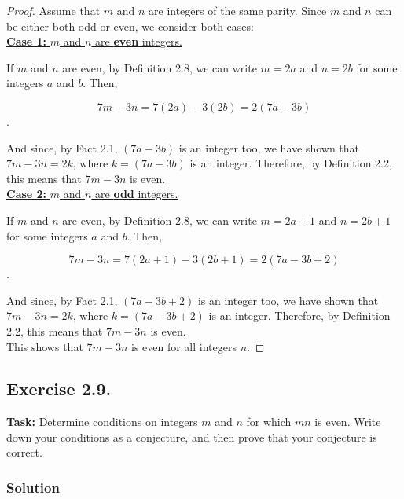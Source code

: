 \documentclass{article}
\begin{document}
\begin{proof}
    Assume that $m$ and $n$ are integers of the same parity. Since $m$ and $n$ can be either both odd or even, we consider both cases:\\

    \noindent \underline{\textbf{Case 1:} $m$ and $n$ are \textbf{even} integers.}

    \noindent If $m$ and $n$ are even, by Definition 2.8, we can write $m = 2a$ and $n=2b$ for some integers $a$ and $b$. Then,

    \[7m-3n=7(2a)-3(2b)=2(7a-3b)\].

    And since, by Fact 2.1, $(7a-3b)$ is an integer too, we have shown that $7m-3n=2k$, where $k=(7a-3b)$ is an integer. Therefore, by Definition 2.2, this means that $7m-3n$ is even.\\

    \noindent \underline{\textbf{Case 2:} $m$ and $n$ are \textbf{odd} integers.}

    \noindent If $m$ and $n$ are even, by Definition 2.8, we can write $m = 2a+1$ and $n=2b+1$ for some integers $a$ and $b$. Then,

    \[7m-3n=7(2a+1)-3(2b+1)=2(7a-3b+2)\].

    And since, by Fact 2.1, $(7a-3b+2)$ is an integer too, we have shown that $7m-3n=2k$, where $k=(7a-3b+2)$ is an integer. Therefore, by Definition 2.2, this means that $7m-3n$ is even.\\

    This shows that $7m-3n$ is even for all integers $n$.
\end{proof}

\subsection{Exercise 2.9.}
\textbf{Task:} Determine conditions on integers $m$ and $n$ for which $mn$ is even. Write down your conditions as a conjecture, and then prove that your conjecture is correct.

\subsubsection*{Solution}
\end{document}
